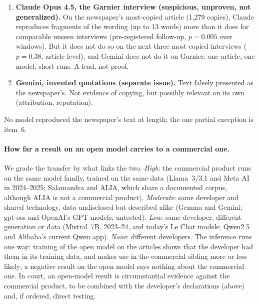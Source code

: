 \documentclass[10pt,a4paper]{article}
\begin{document}
\begin{enumerate}
precisely as someone holding about 1,500 dated addresses, far better than open models trained on the same public
crawls, and twice gave a number almost exactly right. It cannot, however, say which article a number belongs to
(pre-registered reverse test, replicated on a second Gemini model). Third-party links are one explanation; Google's own crawl of the pages is another, which
only access to Google's crawl or training records could settle. Gemma-2, Gemini's open relative, lacks this precision
(median error 162 days against Gemini's 2--3), so it cannot stand in for Gemini on this question; Gemma~3/4 are untested.
\item \textbf{Claude Opus 4.5, the Garnier interview (suspicious, unproven, not generalized).} On the newspaper's
most-copied article (1,279 copies), Claude reproduces fragments of the wording (up to 13 words) more than it does for
comparable unseen interviews (pre-registered follow-up, $p=0.005$ over windows). But it does not do so on the next three
most-copied interviews ($p=0.38$, article level), and Gemini does not do it on Garnier: one article, one model, short
runs. A lead, not proof.
\item \textbf{Gemini, invented quotations (separate issue).} Text falsely presented as the newspaper's. Not evidence
of copying, but possibly relevant on its own (attribution, reputation).
\end{enumerate}
No model reproduced the newspaper's text at length; the one partial exception is item~6.

\paragraph{How far a result on an open model carries to a commercial one.} We grade the transfer by what links the
two. \emph{High}: the commercial product runs on the same model family, trained on the same data (Llama~3/3.1 and
Meta AI in 2024--2025; Salamandra and ALIA, which share a documented corpus, although ALIA is not a commercial
product). \emph{Moderate}: same developer and shared technology, data undisclosed but described alike (Gemma and
Gemini; gpt-oss and OpenAI's GPT models, untested). \emph{Low}: same developer, different generation or data
(Mistral~7B, 2023--24, and today's Le Chat models; Qwen2.5 and Alibaba's current Qwen app). \emph{None}: different
developers. The inference runs one way: training of the open model on the articles shows that the developer had them
in its training data, and makes use in the commercial sibling more or less likely; a negative result on the open model
says nothing about the commercial one. In court, an open-model result is circumstantial evidence against the
commercial product, to be combined with the developer's declarations (above) and, if ordered, direct testing.
\end{document}
